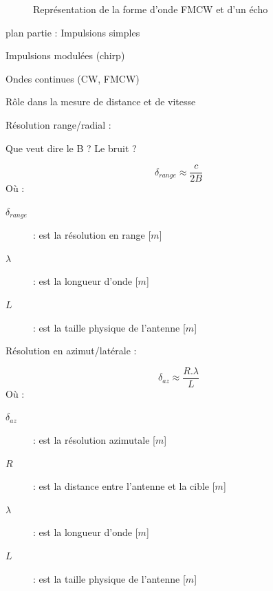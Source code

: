 \begin{figure}[htbp]
    \caption{Représentation de la forme d'onde FMCW et d'un écho}
    \label{fig:fmcw_avec_echo}
\end{figure}



\newpage
plan partie : 
Impulsions simples

Impulsions modulées (chirp)

Ondes continues (CW, FMCW)

Rôle dans la mesure de distance et de vitesse


Résolution range/radial :

Que veut dire le B ? Le bruit ? 

\begin{equation}
    \delta_{range} \approx \frac{c}{2B}
\end{equation}
Où :
\begin{description}
    \item[$\delta_{range}$] : est la résolution en range [$m$]
    \item[$\lambda$] : est la longueur d’onde [$m$]
    \item[$L$] : est la taille physique de l'antenne [$m$]
\end{description}

Résolution en azimut/latérale :

\begin{equation}
    \delta_{az} \approx \frac{R. \lambda}{L}
\end{equation}
Où :
\begin{description}
    \item[$\delta_{az}$] : est la résolution azimutale [$m$]
    \item[$R$] : est la distance entre l'antenne et la cible [$m$]
    \item[$\lambda$] : est la longueur d’onde [$m$]
    \item[$L$] : est la taille physique de l'antenne [$m$]
\end{description}


